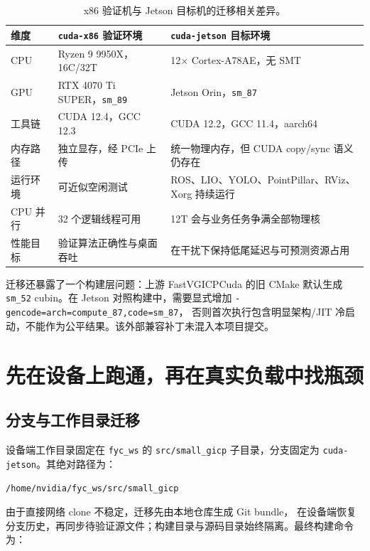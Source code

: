 \documentclass[UTF8,a4paper,11pt,fontset=none]{ctexart}
\begin{document}
\begin{table}[H]
  \centering
  \small
  \caption{x86 验证机与 Jetson 目标机的迁移相关差异。}
  \label{tab:platform}
  \begin{tabularx}{\textwidth}{@{}lYY@{}}
    \toprule
    维度 & \texttt{cuda-x86} 验证环境 & \texttt{cuda-jetson} 目标环境 \\
    \midrule
    CPU & Ryzen 9 9950X，16C/32T & 12$\times$ Cortex-A78AE，无 SMT \\
    GPU & RTX 4070 Ti SUPER，\texttt{sm\_89} & Jetson Orin，\texttt{sm\_87} \\
    工具链 & CUDA 12.4，GCC 12.3 & CUDA 12.2，GCC 11.4，aarch64 \\
    内存路径 & 独立显存，经 PCIe 上传 & 统一物理内存，但 CUDA copy/sync 语义仍存在 \\
    运行环境 & 可近似空闲测试 & ROS、LIO、YOLO、PointPillar、RViz、Xorg 持续运行 \\
    CPU 并行 & 32 个逻辑线程可用 & 12T 会与业务任务争满全部物理核 \\
    性能目标 & 验证算法正确性与桌面吞吐 & 在干扰下保持低尾延迟与可预测资源占用 \\
    \bottomrule
  \end{tabularx}
\end{table}

迁移还暴露了一个构建层问题：上游 FastVGICPCuda 的旧 CMake 默认生成 \texttt{sm\_52}
cubin。在 Jetson 对照构建中，需要显式增加 \texttt{-gencode=arch=compute\_87,code=sm\_87}，
否则首次执行包含明显架构/JIT 冷启动，不能作为公平结果。该外部兼容补丁未混入本项目提交。

\section{先在设备上跑通，再在真实负载中找瓶颈}

\subsection{分支与工作目录迁移}

设备端工作目录固定在 \texttt{fyc\_ws} 的 \texttt{src/small\_gicp} 子目录，分支固定为
\texttt{cuda-jetson}。其绝对路径为：
\begin{center}
  \small\nolinkurl{/home/nvidia/fyc_ws/src/small_gicp}
\end{center}
由于直接网络 clone 不稳定，迁移先由本地仓库生成 Git bundle，
在设备端恢复分支历史，再同步待验证源文件；构建目录与源码目录始终隔离。最终构建命令为：
\end{document}
